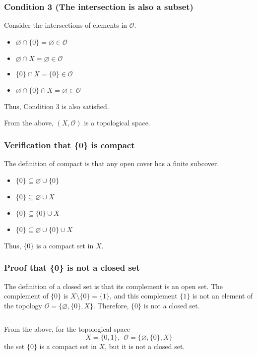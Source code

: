 \documentclass{article}
\begin{document}
\subsubsection{Condition 3 (The intersection is also a subset)}
Consider the intersections of elements in $\mathcal{O}$.
\begin{itemize}
	\item $\varnothing \cap \{0\} = \varnothing \in \mathcal{O}$
	\item $\varnothing \cap X = \varnothing \in \mathcal{O}$
	\item $\{0\} \cap X = \{0\} \in \mathcal{O}$
	\item $\varnothing \cap \{0\} \cap X = \varnothing \in \mathcal{O}$
\end{itemize}
Thus, Condition 3 is also satisfied.

From the above, $(X, \mathcal{O})$ is a topological space.

\subsubsection{Verification that \{0\} is compact}
The definition of compact is that any open cover has a finite subcover.
\begin{itemize}
	\item $ \{ 0\} \subseteq \varnothing \cup \{ 0 \}$
	\item $ \{ 0\} \subseteq \varnothing \cup X$
	\item $ \{ 0\} \subseteq \{ 0 \} \cup X$
	\item $ \{ 0\} \subseteq \varnothing \cup \{ 0 \} \cup X$
\end{itemize}

Thus, $\{0\}$ is a compact set in $X$.


\subsubsection{Proof that \{0\} is not a closed set}

The definition of a closed set is that its complement is an open set.
The complement of $\{0\}$ is $X \setminus \{0\} = \{1\}$, and this complement $\{1\}$ is not an element of the topology $\mathcal{O} = \{\varnothing, \{0\}, X\}$.
Therefore, $\{0\}$ is not a closed set.

${}$

From the above, for the topological space
$$X = \{0, 1\} , \ \ \mathcal{O} = \{\varnothing, \{0\}, X\}$$
the set $\{0\}$ is a compact set in $X$, but it is not a closed set.
\end{document}
